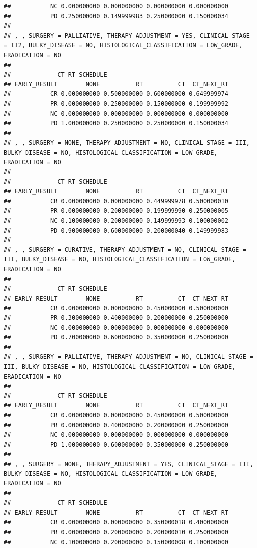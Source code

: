 \documentclass[]{article}
\begin{document}
\begin{verbatim}
##           NC 0.000000000 0.000000000 0.000000000 0.000000000
##           PD 0.250000000 0.149999983 0.250000000 0.150000034
## 
## , , SURGERY = PALLIATIVE, THERAPY_ADJUSTMENT = YES, CLINICAL_STAGE = II2, BULKY_DISEASE = NO, HISTOLOGICAL_CLASSIFICATION = LOW_GRADE, ERADICATION = NO
## 
##             CT_RT_SCHEDULE
## EARLY_RESULT        NONE          RT          CT  CT_NEXT_RT
##           CR 0.000000000 0.500000000 0.600000000 0.649999974
##           PR 0.000000000 0.250000000 0.150000000 0.199999992
##           NC 0.000000000 0.000000000 0.000000000 0.000000000
##           PD 1.000000000 0.250000000 0.250000000 0.150000034
## 
## , , SURGERY = NONE, THERAPY_ADJUSTMENT = NO, CLINICAL_STAGE = III, BULKY_DISEASE = NO, HISTOLOGICAL_CLASSIFICATION = LOW_GRADE, ERADICATION = NO
## 
##             CT_RT_SCHEDULE
## EARLY_RESULT        NONE          RT          CT  CT_NEXT_RT
##           CR 0.000000000 0.000000000 0.449999978 0.500000010
##           PR 0.000000000 0.200000000 0.199999990 0.250000005
##           NC 0.100000000 0.200000000 0.149999993 0.100000002
##           PD 0.900000000 0.600000000 0.200000040 0.149999983
## 
## , , SURGERY = CURATIVE, THERAPY_ADJUSTMENT = NO, CLINICAL_STAGE = III, BULKY_DISEASE = NO, HISTOLOGICAL_CLASSIFICATION = LOW_GRADE, ERADICATION = NO
## 
##             CT_RT_SCHEDULE
## EARLY_RESULT        NONE          RT          CT  CT_NEXT_RT
##           CR 0.000000000 0.000000000 0.450000000 0.500000000
##           PR 0.300000000 0.400000000 0.200000000 0.250000000
##           NC 0.000000000 0.000000000 0.000000000 0.000000000
##           PD 0.700000000 0.600000000 0.350000000 0.250000000
## 
## , , SURGERY = PALLIATIVE, THERAPY_ADJUSTMENT = NO, CLINICAL_STAGE = III, BULKY_DISEASE = NO, HISTOLOGICAL_CLASSIFICATION = LOW_GRADE, ERADICATION = NO
## 
##             CT_RT_SCHEDULE
## EARLY_RESULT        NONE          RT          CT  CT_NEXT_RT
##           CR 0.000000000 0.000000000 0.450000000 0.500000000
##           PR 0.000000000 0.400000000 0.200000000 0.250000000
##           NC 0.000000000 0.000000000 0.000000000 0.000000000
##           PD 1.000000000 0.600000000 0.350000000 0.250000000
## 
## , , SURGERY = NONE, THERAPY_ADJUSTMENT = YES, CLINICAL_STAGE = III, BULKY_DISEASE = NO, HISTOLOGICAL_CLASSIFICATION = LOW_GRADE, ERADICATION = NO
## 
##             CT_RT_SCHEDULE
## EARLY_RESULT        NONE          RT          CT  CT_NEXT_RT
##           CR 0.000000000 0.000000000 0.350000018 0.400000000
##           PR 0.000000000 0.200000000 0.200000010 0.250000000
##           NC 0.100000000 0.200000000 0.150000008 0.100000000

\end{verbatim}
\end{document}
